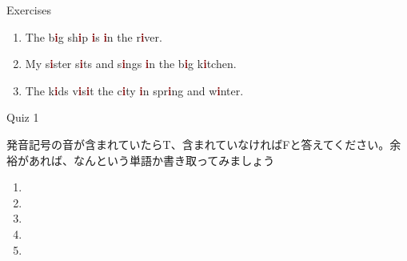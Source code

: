 \documentclass[aspectratio=169,xcolor={dvipsnames,table}]{beamer}
\begin{document}
\begin{frame}[plain]{Exercises }
\LARGE

\begin{enumerate}
 \item The b\textcolor{Maroon}{\bfseries i}g sh\textcolor{Maroon}{\bfseries i}p \textcolor{Maroon}{\bfseries i}s \textcolor{Maroon}{\bfseries i}n the r\textcolor{Maroon}{\bfseries i}ver.
 \item My s\textcolor{Maroon}{\bfseries i}ster s\textcolor{Maroon}{\bfseries i}ts and s\textcolor{Maroon}{\bfseries i}ngs \textcolor{Maroon}{\bfseries i}n the b\textcolor{Maroon}{\bfseries i}g k\textcolor{Maroon}{\bfseries i}tchen.
 \item The k\textcolor{Maroon}{\bfseries i}ds v\textcolor{Maroon}{\bfseries i}s\textcolor{Maroon}{\bfseries i}t the c\textcolor{Maroon}{\bfseries i}ty \textcolor{Maroon}{\bfseries i}n spr\textcolor{Maroon}{\bfseries i}ng and w\textcolor{Maroon}{\bfseries i}nter.

\end{enumerate}
\hfill{\scriptsize {}}

\end{frame}
\begin{frame}[plain]{Quiz 1}

 発音記号の音が含まれていたらT、含まれていなければFと答えてください。余裕があれば、なんという単語か書き取ってみましょう

\LARGE
\begin{enumerate}
 \item \mbox{}\hspace{40pt}\hspace{150pt}\mbox{}
 \item \mbox{}\hspace{40pt}\hspace{150pt}\mbox{}
 \item \mbox{}\hspace{40pt}\hspace{150pt}\mbox{}
 \item \mbox{}\hspace{40pt}\hspace{150pt}\mbox{}
 \item \mbox{}\hspace{40pt}\hspace{150pt}\mbox{}
\end{enumerate}
\hfill{\scriptsize {}}

\end{frame}
\end{document}
